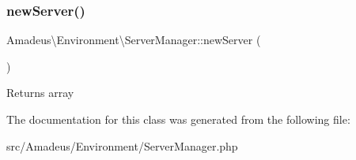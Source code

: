 \subsubsection{\texorpdfstring{new\+Server()}{newServer()}}
{\footnotesize\ttfamily Amadeus\textbackslash{}\+Environment\textbackslash{}\+Server\+Manager\+::new\+Server (\begin{DoxyParamCaption}{ }\end{DoxyParamCaption})}

\begin{DoxyReturn}{Returns}
array 
\end{DoxyReturn}


The documentation for this class was generated from the following file\+:\begin{DoxyCompactItemize}
\item 
src/\+Amadeus/\+Environment/Server\+Manager.\+php\end{DoxyCompactItemize}
